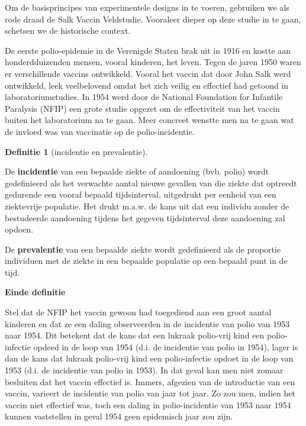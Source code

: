 \documentclass[
  12pt,dutch,coursenotes]{book}
\theoremstyle{definition}
\newtheorem{definition}{Definitie}[chapter]
\theoremstyle{definition}
\theoremstyle{definition}
\theoremstyle{definition}
\theoremstyle{remark}
\begin{document}
Om de basisprincipes van experimentele designs in te voeren, gebruiken we als rode draad de Salk Vaccin Veldstudie. Vooraleer dieper op deze studie in te gaan, schetsen we de historische context.

De eerste polio-epidemie in de Verenigde Staten brak uit in 1916 en kostte
aan honderdduizenden mensen, vooral kinderen, het leven. Tegen de jaren 1950
waren er verschillende vaccins ontwikkeld. Vooral het vaccin dat door John
Salk werd ontwikkeld, leek veelbelovend omdat het zich veilig en effectief
had getoond in laboratoriumstudies. In 1954 werd door de National Foundation
for Infantile Paralysis (NFIP) een grote studie opgezet om de effectiviteit
van het vaccin buiten het laboratorium na te gaan. Meer concreet wenstte men
na te gaan wat de invloed was van vaccinatie op de polio-incidentie.

\begin{definition}[incidentie en prevalentie]
\protect\hypertarget{def:unnamed-chunk-65}{}{\label{def:unnamed-chunk-65} {} }
\end{definition}
De \textbf{incidentie} van een bepaalde ziekte of aandoening (bvb. polio)
wordt gedefinieerd als het verwachte aantal nieuwe gevallen van die ziekte
dat optreedt gedurende een vooraf bepaald tijdsinterval, uitgedrukt per
eenheid van een ziektevrije populatie. Het drukt m.a.w. de kans uit dat een
individu zonder de bestudeerde aandoening tijdens het gegeven tijdsinterval
deze aandoening zal opdoen.

De \textbf{prevalentie} van een bepaalde ziekte wordt gedefinieerd als de
proportie individuen met de ziekte in een bepaalde populatie op een bepaald
punt in de tijd.

\textbf{Einde definitie}

Stel dat de NFIP het vaccin gewoon had toegediend aan een groot aantal
kinderen en dat ze een daling observeerden in de incidentie van polio van
1953 naar 1954. Dit betekent dat de kans dat een lukraak polio-vrij kind een
polio-infectie opdeed in de loop van 1954 (d.i. de incidentie van polio in
1954), lager is dan de kans dat lukraak polio-vrij kind een polio-infectie
opdoet in de loop van 1953 (d.i. de incidentie van polio in 1953). In dat
geval kan men niet zomaar besluiten dat het vaccin effectief is. Immers,
afgezien van de introductie van een vaccin, varieert de incidentie van polio
van jaar tot jaar. Zo zou men, indien het vaccin niet effectief was, toch
een daling in polio-incidentie van 1953 naar 1954 kunnen vaststellen in
geval 1954 geen epidemisch jaar zou zijn.
\end{document}
